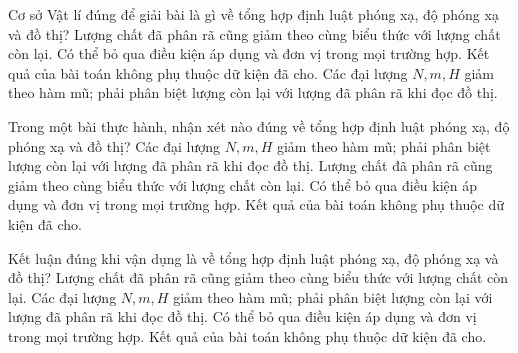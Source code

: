 \begin{ex}
Cơ sở Vật lí đúng để giải bài là gì về tổng hợp định luật phóng xạ, độ phóng xạ và đồ thị?
\choice
{Lượng chất đã phân rã cũng giảm theo cùng biểu thức với lượng chất còn lại.}
{Có thể bỏ qua điều kiện áp dụng và đơn vị trong mọi trường hợp.}
{Kết quả của bài toán không phụ thuộc dữ kiện đã cho.}
{\True Các đại lượng $N,m,H$ giảm theo hàm mũ; phải phân biệt lượng còn lại với lượng đã phân rã khi đọc đồ thị.}
\end{ex}

\begin{ex}
Trong một bài thực hành, nhận xét nào đúng về tổng hợp định luật phóng xạ, độ phóng xạ và đồ thị?
\choice
{\True Các đại lượng $N,m,H$ giảm theo hàm mũ; phải phân biệt lượng còn lại với lượng đã phân rã khi đọc đồ thị.}
{Lượng chất đã phân rã cũng giảm theo cùng biểu thức với lượng chất còn lại.}
{Có thể bỏ qua điều kiện áp dụng và đơn vị trong mọi trường hợp.}
{Kết quả của bài toán không phụ thuộc dữ kiện đã cho.}
\end{ex}

\begin{ex}
Kết luận đúng khi vận dụng là về tổng hợp định luật phóng xạ, độ phóng xạ và đồ thị?
\choice
{Lượng chất đã phân rã cũng giảm theo cùng biểu thức với lượng chất còn lại.}
{\True Các đại lượng $N,m,H$ giảm theo hàm mũ; phải phân biệt lượng còn lại với lượng đã phân rã khi đọc đồ thị.}
{Có thể bỏ qua điều kiện áp dụng và đơn vị trong mọi trường hợp.}
{Kết quả của bài toán không phụ thuộc dữ kiện đã cho.}
\end{ex}

